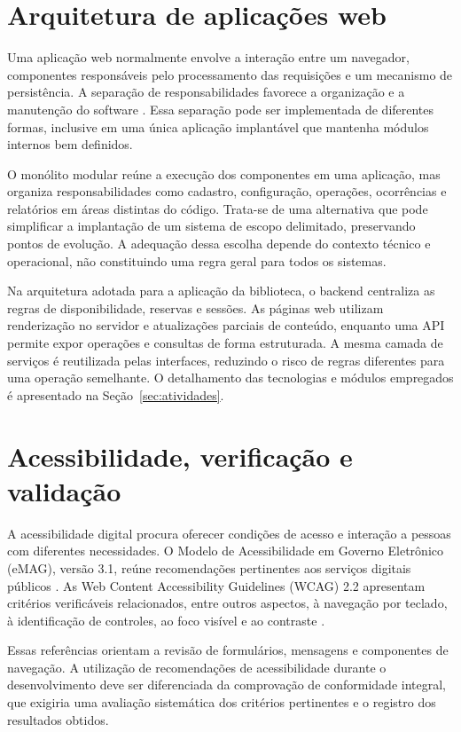\section{Arquitetura de aplicações web}\label{sec:arquitetura}

Uma aplicação web normalmente envolve a interação entre um navegador, componentes responsáveis pelo processamento das requisições e um mecanismo de persistência. A separação de responsabilidades favorece a organização e a manutenção do software \cite{sommerville2016}. Essa separação pode ser implementada de diferentes formas, inclusive em uma única aplicação implantável que mantenha módulos internos bem definidos.

O monólito modular reúne a execução dos componentes em uma aplicação, mas organiza responsabilidades como cadastro, configuração, operações, ocorrências e relatórios em áreas distintas do código. Trata-se de uma alternativa que pode simplificar a implantação de um sistema de escopo delimitado, preservando pontos de evolução. A adequação dessa escolha depende do contexto técnico e operacional, não constituindo uma regra geral para todos os sistemas.

Na arquitetura adotada para a aplicação da biblioteca, o backend centraliza as regras de disponibilidade, reservas e sessões. As páginas web utilizam renderização no servidor e atualizações parciais de conteúdo, enquanto uma API permite expor operações e consultas de forma estruturada. A mesma camada de serviços é reutilizada pelas interfaces, reduzindo o risco de regras diferentes para uma operação semelhante. O detalhamento das tecnologias e módulos empregados é apresentado na Seção~\ref{sec:atividades}.

\section{Acessibilidade, verificação e validação}\label{sec:qualidade}

A acessibilidade digital procura oferecer condições de acesso e interação a pessoas com diferentes necessidades. O Modelo de Acessibilidade em Governo Eletrônico (eMAG), versão 3.1, reúne recomendações pertinentes aos serviços digitais públicos \cite{emag2014}. As Web Content Accessibility Guidelines (WCAG) 2.2 apresentam critérios verificáveis relacionados, entre outros aspectos, à navegação por teclado, à identificação de controles, ao foco visível e ao contraste \cite{wcag22_2024}.

Essas referências orientam a revisão de formulários, mensagens e componentes de navegação. A utilização de recomendações de acessibilidade durante o desenvolvimento deve ser diferenciada da comprovação de conformidade integral, que exigiria uma avaliação sistemática dos critérios pertinentes e o registro dos resultados obtidos.

